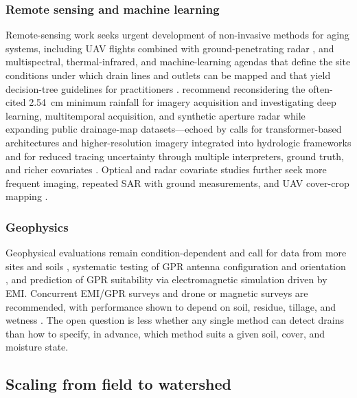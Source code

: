 \subsubsection{Remote sensing and machine learning}

Remote-sensing work seeks urgent development of non-invasive methods for aging
systems, including UAV flights combined with ground-penetrating radar
\parencite{Wienken2024}, and multispectral, thermal-infrared, and
machine-learning agendas that define the site conditions under which drain
lines and outlets can be mapped and that yield decision-tree guidelines for
practitioners \parencite{Allred2020,Allred2021,Allred2022}. \textcite{Carlsen2024}
recommend reconsidering the often-cited 2.54~cm minimum rainfall for imagery
acquisition and investigating deep learning, multitemporal acquisition, and
synthetic aperture radar while expanding public drainage-map datasets---echoed
by calls for transformer-based architectures and higher-resolution imagery
integrated into hydrologic frameworks \parencite{Wan2024} and for reduced
tracing uncertainty through multiple interpreters, ground truth, and richer
covariates \parencite{Redoloza2023,Harris2018,Yimer2023}. Optical and radar
covariate studies further seek more frequent imaging, repeated SAR with ground
measurements, and UAV cover-crop mapping
\parencite{Tlapáková2017,Meunier2001,Xu2018}.

\subsubsection{Geophysics}

Geophysical evaluations remain condition-dependent and call for data from more
sites and soils \parencite{Allred2005}, systematic testing of GPR antenna
configuration and orientation \parencite{Allred2013}, and prediction of GPR
suitability via electromagnetic simulation driven by EMI. Concurrent EMI/GPR
surveys and drone or magnetic surveys are recommended, with performance shown to
depend on soil, residue, tillage, and wetness
\parencite{Koganti2020,Koganti2021,Jouen2018,Kratt2020,Allred2018b}. The
open question is less whether any single method can detect drains than how to
specify, in advance, which method suits a given soil, cover, and moisture
state.

\subsection{Scaling from field to watershed}

